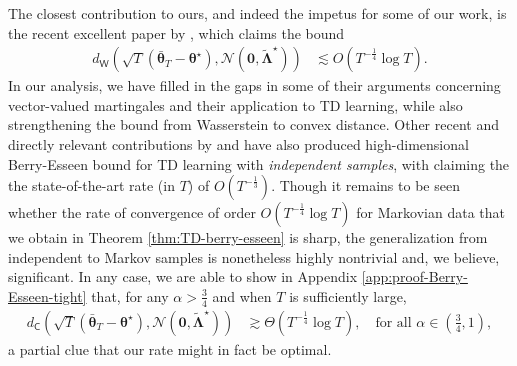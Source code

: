 The closest contribution to ours, and indeed the impetus for some of our work,  is the recent excellent paper by \cite{srikant2024rates}, which claims the bound 
\begin{align*}
    d_{\mathsf{W}}(\sqrt{T}(\bar{\bm{\theta}}_T-\bm{\theta}^\star),\mathcal{N}(\bm{0},\tilde{\bm{\Lambda}}^\star)) &\lesssim O(T^{-\frac{1}{4}}\log T).
\end{align*}
In our analysis, we have filled in the gaps in some of their arguments concerning vector-valued martingales and their application to TD learning, while also strengthening the bound from Wasserstein to convex distance.
Other recent and directly relevant contributions by \cite{samsonov2024gaussian} and \cite{wu2024statistical} have also produced high-dimensional Berry-Esseen bound for TD learning with \emph{independent samples},  with \cite{wu2024statistical} claiming the the state-of-the-art rate (in $T$) of $O(T^{-\frac{1}{3}})$. Though it remains to be seen whether the rate of convergence of order  $O(T^{-\frac{1}{4}}\log T)$ for Markovian data that we obtain in Theorem \ref{thm:TD-berry-esseen} is sharp, the generalization from independent to Markov samples is nonetheless highly nontrivial and, we believe,  significant. In any case, we are able to show in Appendix \ref{app:proof-Berry-Esseen-tight} that, for any $\alpha > \frac{3}{4}$ and when $T$ is sufficiently large,
\begin{align}\label{eq:TD-Berry-Esseen-tight}
d_{\mathsf{C}}(\sqrt{T}(\bar{\bm{\theta}}_T-\bm{\theta}^\star),\mathcal{N}(\bm{0},\tilde{\bm{\Lambda}}^\star)) &\gtrsim \Theta(T^{-\frac{1}{4}}\log T),\quad\text{for all } \alpha \in \left(\frac{3}{4},1\right),
\end{align}
a partial clue that our rate might in fact be optimal.




